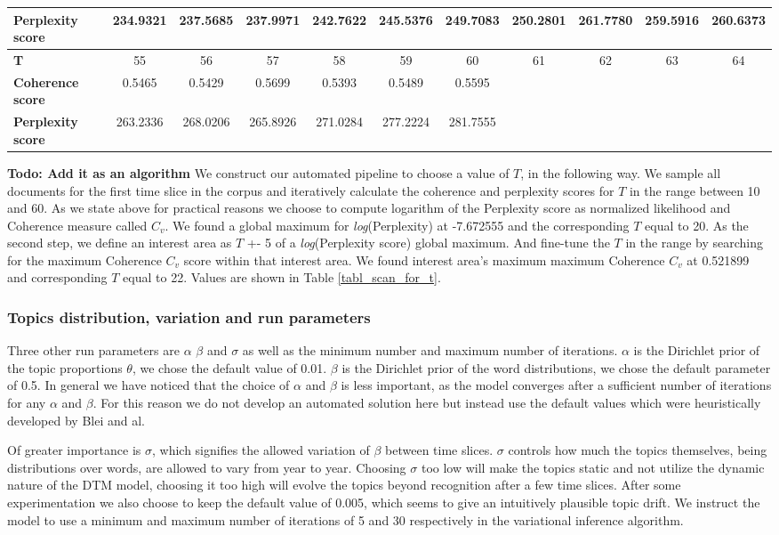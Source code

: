 \documentclass[12pt,journal,letterpaper,oneside,onecolumn]{IEEEtran}
\begin{document}
\begin{table}[h!]
\begin{tabular}{l|c|c|c|c|c|c|c|c|c|c}
\textbf{Perplexity score} & 234.9321 & 237.5685 & 237.9971 & 242.7622 & 245.5376 & 249.7083 & 250.2801 & 261.7780 & 259.5916 & 260.6373 \\ 
\hline
\textbf{T} & 55 & 56 & 57 & 58 & 59 & 60 & 61 & 62 & 63 & 64 \\ 
\hline
\textbf{Coherence score}  & 0.5465 & 0.5429 & 0.5699 & 0.5393 & 0.5489 & 0.5595 \\ 
\textbf{Perplexity score} & 263.2336 & 268.0206 & 265.8926 & 271.0284 & 277.2224 & 281.7555 \\ 
\end{tabular}
\end{table}

\textbf{Todo: Add it as an algorithm}
We construct our automated pipeline to choose a value of $T$, in the following way. We sample all documents for the first time slice in the corpus and iteratively calculate the coherence and perplexity scores for $T$ in the range between 10 and 60. As we state above for practical reasons we choose to compute logarithm of the Perplexity score as normalized likelihood and Coherence measure called $C_v$. We found a global maximum for \textit{log}(Perplexity) at -7.672555 and the corresponding $T$ equal to 20. As the second step, we define an interest area as $T$ +- 5 of a \textit{log}(Perplexity score) global maximum. And fine-tune the $T$ in the range by searching for the maximum Coherence $C_v$ score within that interest area. We found interest area's maximum maximum Coherence $C_v$ at 0.521899 and corresponding $T$ equal to 22.
Values are shown in Table \ref{tabl_scan_for_t}.

\subsubsection{Topics distribution, variation and run parameters}
Three other run parameters are $\alpha$ $\beta$ and $\sigma$  as well as the minimum number and maximum number of iterations. 
$\alpha $ is the Dirichlet prior of the topic proportions $\theta$, we chose the default value of 0.01. $\beta$ is the Dirichlet prior of the word distributions, we chose the default parameter of 0.5.
In general we have noticed that the choice of $\alpha$ and $\beta$ is less important, as the model converges after a sufficient number of iterations for any $\alpha$ and $\beta$. For this reason we do not develop an automated solution here but instead use the default values which were heuristically developed by Blei and al.

Of greater importance is $\sigma$, which signifies the allowed variation of $\beta$ between time slices. $\sigma$ controls how much the topics themselves, being distributions over words, are allowed to vary from year to year.
Choosing $\sigma$ too low will make the topics static and not utilize the dynamic nature of the DTM model, choosing it too high will evolve the topics beyond recognition after a few time slices.
After some experimentation we also choose to keep the default value of 0.005, which seems to give an intuitively plausible topic drift. 
We instruct the model to use a minimum and maximum number of iterations of 5 and 30 respectively in the variational inference algorithm.
\end{document}
